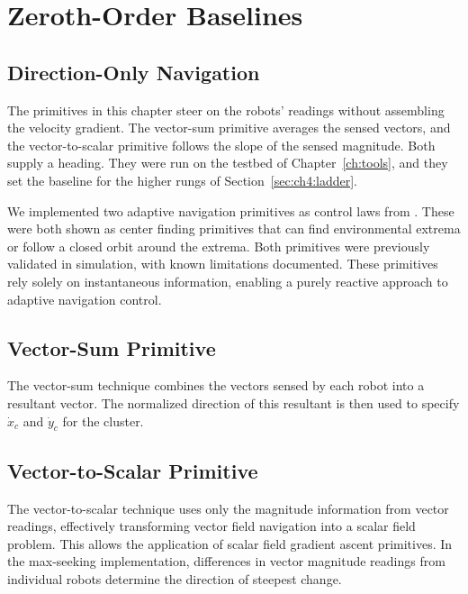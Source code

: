 \chapter{Zeroth-Order Baselines}
\label{ch:zeroth}

\section{Direction-Only Navigation}
\label{sec:ch5:intro}

The primitives in this chapter steer on the robots' readings without
assembling the velocity gradient. The vector-sum primitive averages the
sensed vectors, and the vector-to-scalar primitive follows the slope of
the sensed magnitude. Both supply a heading. They were run on the testbed
of Chapter~\ref{ch:tools}, and they set the baseline for the higher rungs
of Section~\ref{sec:ch4:ladder}.

We implemented two adaptive navigation
primitives as control laws from \cite{26}. These were both shown as
center finding primitives that can find environmental extrema or follow a
closed orbit around the extrema. Both primitives were previously
validated in simulation, with known limitations documented. These
primitives rely solely on instantaneous information, enabling a purely
reactive approach to adaptive navigation control.

\section{Vector-Sum Primitive}
\label{sec:ch5:vector_sum}

The vector-sum technique combines the vectors sensed by each robot into a
resultant vector. The normalized direction of this resultant is then used
to specify $\dot{x}_c$ and $\dot{y}_c$ for the cluster.

\section{Vector-to-Scalar Primitive}
\label{sec:ch5:vector_to_scalar}

The vector-to-scalar technique uses only the magnitude information from
vector readings, effectively transforming vector field navigation into a
scalar field problem. This allows the application of scalar field
gradient ascent primitives. In the max-seeking implementation,
differences in vector magnitude readings from individual robots determine
the direction of steepest change.

